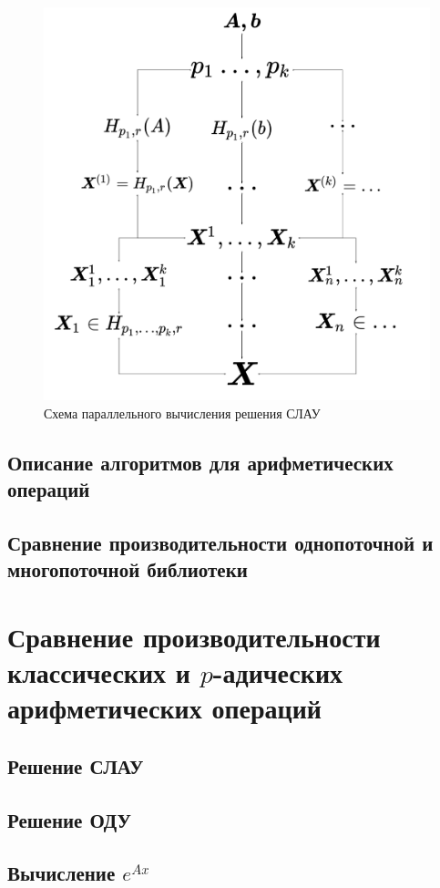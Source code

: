 \documentclass[master, och, diploma, times]{sty/SCWorks}
\theoremstyle{plain}
\theoremstyle{definition}
\begin{document}
\begin{figure}[H]
\centerline{\includegraphics[width=0.85\linewidth]{images/multi/algo.png}}
\caption{Схема параллельного вычисления решения СЛАУ}
\label{img:multi:algo}
\end{figure}




\subsection{Описание алгоритмов для арифметических операций}
\subsection{Сравнение производительности однопоточной и многопоточной библиотеки} 


\section{Сравнение производительности классических и $p$-адических арифметических операций}
\subsection{Решение СЛАУ}
\subsection{Решение ОДУ}
\subsection{Вычисление $e^{Ax}$}
\end{document}
